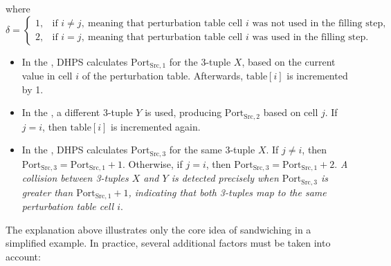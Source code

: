 \documentclass{report}
\begin{document}
\vspace{0.5em}

where
\[
\delta =
\begin{cases}
1, & \text{if } i \neq j,\ \text{meaning that perturbation table cell } i \text{ was not used in the filling step,} \\
2, & \text{if } i = j,\ \text{meaning that perturbation table cell } i \text{ was used in the filling step.}
\end{cases}
\]

\begin{itemize}
    \item In the , DHPS calculates \(\text{Port}_{\text{Src},1}\) for the 3-tuple \( X \), based on the current value in cell \( i \) of the perturbation table. Afterwards, \(\text{table}[i]\) is incremented by 1.
    \item In the , a different 3-tuple \( Y \) is used, producing \(\text{Port}_{\text{Src},2}\) based on cell \( j \). If \( j = i \), then \(\text{table}[i]\) is incremented again.
    \item In the , DHPS calculates \(\text{Port}_{\text{Src},3}\) for the same 3-tuple \( X \). If \( j \neq i \), then \(\text{Port}_{\text{Src},3} = \text{Port}_{\text{Src},1} + 1\). Otherwise, if \( j = i \), then \(\text{Port}_{\text{Src},3} = \text{Port}_{\text{Src},1} + 2\). \textit{A collision between 3-tuples \( X \) and \( Y \) is detected precisely when \(\text{Port}_{\text{Src},3}\) is greater than \(\text{Port}_{\text{Src},1} + 1\), indicating that both 3-tuples map to the same perturbation table cell \( i \)}.
\end{itemize}

The explanation above illustrates only the \alert{core idea of sandwiching} in a simplified example. In practice, several additional factors must be taken into account:
\end{document}
